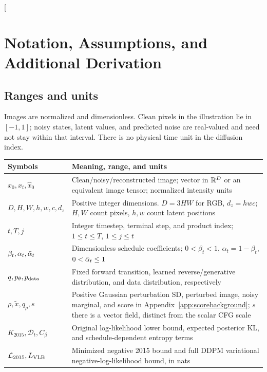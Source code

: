 \pagecut
\nobalance
\twocolumn[{
\section{Notation, Assumptions, and Additional Derivation}\label{app:notation}
\subsection{Ranges and units}
Images are normalized and dimensionless. Clean pixels in the illustration
lie in $[-1,1]$; noisy states, latent values, and predicted noise are
real-valued and need not stay within that interval.
There is no physical time unit in the diffusion index.

\begin{center}
\begin{minipage}{\textwidth}
\centering\small
\captionsetup{hypcap=false}
\begin{tabularx}{\linewidth}{@{}p{3.3cm}Y@{}}
\toprule
Symbols & Meaning, range, and units\\
\midrule
$x_0,x_t,\hat x_0$ & Clean/noisy/reconstructed image; vector in $\mathbb{R}^D$ or
an equivalent image tensor; normalized intensity units\\
$D,H,W,h,w,c,d_z$ & Positive integer dimensions. $D=3HW$ for RGB,
$d_z=hwc$; $H,W$ count pixels, $h,w$ count latent positions\\
$t,T,j$ & Integer timestep, terminal step, and product index;
$1\le t\le T$, $1\le j\le t$\\
$\beta_t,\alpha_t,\bar{\alpha}_t$ & Dimensionless schedule coefficients;
$0<\beta_t<1$, $\alpha_t=1-\beta_t$, $0<\bar{\alpha}_t\le1$\\
$q,p_\theta,p_{\rm data}$ & Fixed forward transition, learned reverse/generative
distribution, and data distribution, respectively\\
$\rho,\tilde x,q_\rho,s$ & Positive Gaussian perturbation SD, perturbed
image, noisy marginal, and score in Appendix~\ref{app:scorebackground}; $s$ there
is a vector field, distinct from the scalar CFG scale\\
$K_{2015},\mathcal D_t,C_\beta$ & Original log-likelihood lower bound,
expected posterior KL, and schedule-dependent entropy terms\\
$\mathcal L_{2015},L_{\rm VLB}$ & Minimized negative 2015 bound and full
DDPM variational negative-log-likelihood bound, in nats\\

\end{tabularx}
\end{minipage}
\end{center}}

